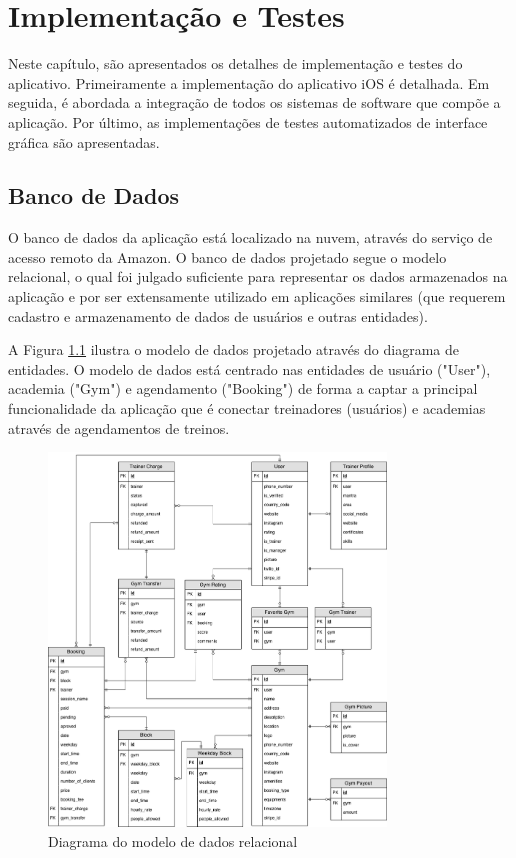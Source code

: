 \chapter{Implementação e Testes} \label{cap:development}
Neste capítulo, são apresentados os detalhes de implementação e testes do aplicativo. Primeiramente a implementação do aplicativo iOS é detalhada. Em seguida, é abordada a integração de todos os sistemas de software que compõe a aplicação. Por último, as implementações de testes automatizados de interface gráfica são apresentadas. 

\section{Banco de Dados}
O banco de dados da aplicação está localizado na nuvem, através do serviço de acesso remoto da Amazon. O banco de dados projetado segue o modelo relacional, o qual foi julgado suficiente para representar os dados armazenados na aplicação e por ser extensamente utilizado em aplicações similares (que requerem cadastro e armazenamento de dados de usuários e outras entidades).

A Figura \ref{fig:database} ilustra o modelo de dados projetado através do diagrama de entidades. O modelo de dados está centrado nas entidades de usuário ("User"), academia ("Gym") e agendamento ("Booking") de forma a captar a principal funcionalidade da aplicação que é conectar treinadores (usuários) e academias através de agendamentos de treinos.

\begin{figure}[H]
    \centering
    \includegraphics[width=0.8\textwidth]{pfc/figuras/database-schema.png}
    \caption{Diagrama do modelo de dados relacional}
    \label{fig:database}
\end{figure}


